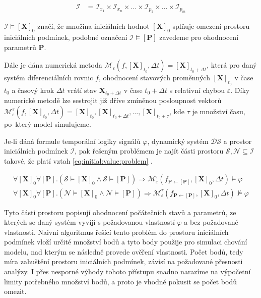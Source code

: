 \begin{align}
\mathcal{I} &= \mathcal{I}_{x_1} \times \mathcal{I}_{x_n} \times \ldots \times \mathcal{I}_{p_1} \times \ldots \times \mathcal{I}_{p_m}
\end{align}

$\mathcal{I} \models [\mathbf{X}]_0$ značí, že množina iniciálních hodnot $[\mathbf{X}]_0$ splňuje
omezení prostoru iniciálních podmínek, podobné označení $\mathcal{I} \models [\mathbf{P}]$ zavedeme
pro ohodnocení parametrů $\mathbf{P}$.

Dále je dána numerická metoda $\mathcal{M}_\varepsilon (f, [\mathbf{X}]_{t_0}, \Delta t) = [\mathbf{X}]_{t_0 + \Delta t}$,
která pro daný systém diferenciálních rovnic $f$,
ohodnocení stavových proměnných $[\mathbf{X}]_{t_0}$ v čase $t_0$ a časový krok $\Delta t$
vrátí stav $\mathbf{X}_{t_0 + \Delta t}$ v čase $t_0 + \Delta t$ s relativní chybou $\varepsilon$.
Díky numerické metodě lze sestrojit již dříve zmíněnou posloupnost vektorů
$\mathcal{M}^{\tau}_\varepsilon(f, [\mathbf{X}]_{t_0}, \Delta t) = [\mathbf{X}]_{t_0}, [\mathbf{X}]_{t_0 + \Delta t}, \ldots, [\mathbf{X}]_{t_0 + \tau}$, kde $\tau$
je množství času, po~který model simulujeme.

Je-li dáná formule temporální logiky signálů $\varphi$, dynamický systém $\mathcal{DS}$
a prostor iniciálních podmínek $\mathcal{I}$, pak řešeným problémem je najít
části prostoru $\mathcal{S}, \mathcal{N} \subseteq \mathcal{I}$ takové, že platí
vztah \ref{eq:initial:value:problem} \cite[str. 23]{drazan2011}.

\begin{align}\label{eq:initial:value:problem}
\forall [\mathbf{X}]_0 \forall [\mathbf{P}] . (\mathcal{S} \models [\mathbf{X}]_0 \wedge \mathcal{S} \models [\mathbf{P}])
\Rightarrow \mathcal{M}^\tau_\varepsilon(f_{\mathbf{P} \leftarrow [\mathbf{P}]}, [\mathbf{X}]_0, \Delta t) \models \varphi \\
\forall [\mathbf{X}]_0 \forall [\mathbf{P}] . (\mathcal{N} \models [\mathbf{X}]_0 \wedge \mathcal{N} \models [\mathbf{P}])
\Rightarrow \mathcal{M}^\tau_\varepsilon(f_{\mathbf{P} \leftarrow [\mathbf{P}]}, [\mathbf{X}]_0, \Delta t) \not\models \varphi
\end{align}

Tyto části prostoru popisují ohodnocení počátečních stavů a parametrů, ze kterých se daný systém vyvíjí
s požadovanou vlastností $\varphi$ a bez po\-ža\-do\-vané vlastnosti. Naivní algoritmus řešící
tento problém do prostoru iniciálních podmínek vloží určité množství bodů a tyto body
použije pro simulaci chování modelu, nad kterým se následně provede ověření vlastnosti.
Počet bodů, tedy míra zahuštění prostoru iniciálních podmínek, závisí na požadované přesnosti
analýzy. I přes nesporné výhody tohoto přístupu snadno narazíme na výpočetní limity
potřebného množství bodů, a proto je vhodné pokusit se počet bodů omezit.


